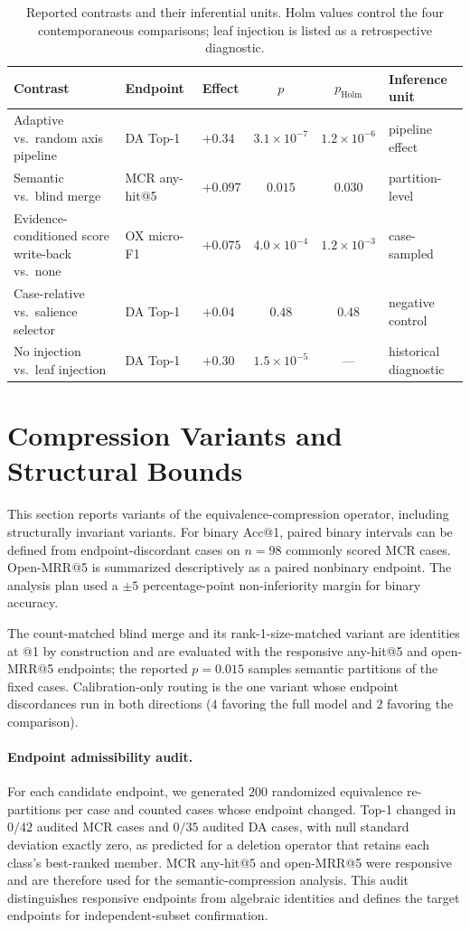 \documentclass[letterpaper]{article}
\begin{document}
\begin{table}[t]
\centering
\small
\begin{tabular}{@{}lllcc l@{}}
\toprule
Contrast & Endpoint & Effect & $p$ & $p_{\mathrm{Holm}}$ & Inference unit \\
\midrule
Adaptive vs.\ random axis pipeline & DA Top-1 & $+0.34$ & $3.1{\times}10^{-7}$ & $1.2{\times}10^{-6}$ & pipeline effect \\
Semantic vs.\ blind merge & MCR any-hit@5 & $+0.097$ & $0.015$ & $0.030$ & partition-level \\
Evidence-conditioned score write-back vs.\ none & OX micro-F1 & $+0.075$ & $4.0{\times}10^{-4}$ & $1.2{\times}10^{-3}$ & case-sampled \\
Case-relative vs.\ salience selector & DA Top-1 & $+0.04$ & $0.48$ & $0.48$ & negative control \\
\midrule
No injection vs.\ leaf injection & DA Top-1 & $+0.30$ & $1.5{\times}10^{-5}$ & --- & historical diagnostic \\
\bottomrule
\end{tabular}
\caption{Reported contrasts and their inferential units. Holm values control the four contemporaneous comparisons; leaf injection is listed as a retrospective diagnostic.}
\label{tab:confirmatory}
\end{table}

\section{Compression Variants and Structural Bounds}

This section reports variants of the equivalence-compression operator, including structurally invariant variants.
For binary Acc@1, paired binary intervals can be defined from endpoint-discordant cases on $n=98$ commonly scored MCR cases.
Open-MRR@5 is summarized descriptively as a paired nonbinary endpoint.
The analysis plan used a $\pm5$ percentage-point non-inferiority margin for binary accuracy.

The count-matched blind merge and its rank-1-size-matched variant are identities at @1 by construction and are evaluated with the responsive any-hit@5 and open-MRR@5 endpoints; the reported $p=0.015$ samples semantic partitions of the fixed cases.
Calibration-only routing is the one variant whose endpoint discordances run in both directions ($4$ favoring the full model and $2$ favoring the comparison).

\paragraph{Endpoint admissibility audit.}
For each candidate endpoint, we generated $200$ randomized equivalence re-partitions per case and counted cases whose endpoint changed.
Top-1 changed in $0/42$ audited MCR cases and $0/35$ audited DA cases, with null standard deviation exactly zero, as predicted for a deletion operator that retains each class's best-ranked member.
MCR any-hit@5 and open-MRR@5 were responsive and are therefore used for the semantic-compression analysis.
This audit distinguishes responsive endpoints from algebraic identities and defines the target endpoints for independent-subset confirmation.
\end{document}
